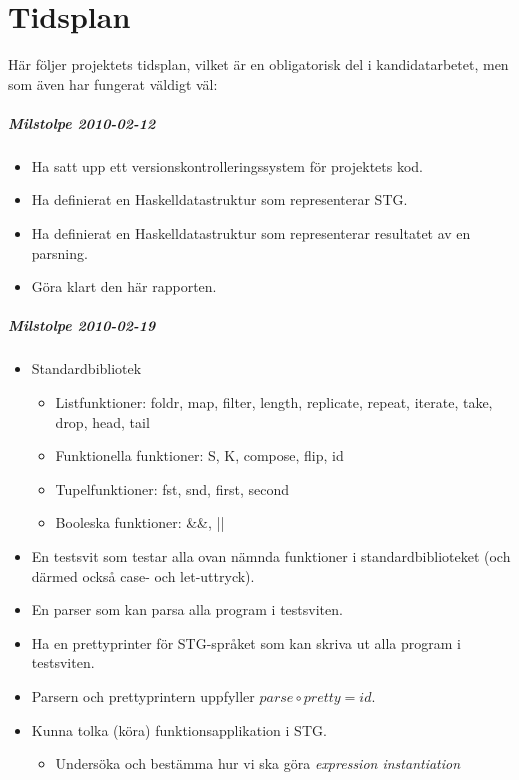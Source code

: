 \documentclass[../Appendix]{subfiles}
\begin{document}
\chapter{Tidsplan}

Här följer projektets tidsplan, vilket är en obligatorisk del i kandidatarbetet,
men som även har fungerat väldigt väl: 

\paragraph{Milstolpe 2010-02-12 }
\begin{itemize}
\item Ha satt upp ett versionskontrolleringssystem för projektets kod.
\item Ha definierat en Haskelldatastruktur som representerar STG.
\item Ha definierat en Haskelldatastruktur som representerar resultatet
av en parsning.
\item Göra klart den här rapporten.
\end{itemize}

\paragraph{Milstolpe 2010-02-19}
\begin{itemize}
\item Standardbibliotek

\begin{itemize}
\item Listfunktioner: foldr, map, filter, length, replicate, repeat, iterate,
take, drop, head, tail
\item Funktionella funktioner: S, K, compose, flip, id
\item Tupelfunktioner: fst, snd, first, second
\item Booleska funktioner: \&\&, ||
\end{itemize}
\item En testsvit som testar alla ovan nämnda funktioner i standardbiblioteket
(och därmed också case- och let-uttryck).
\item En parser som kan parsa alla program i testsviten.
\item Ha en prettyprinter för STG-språket som kan skriva ut alla program
i testsviten.
\item Parsern och prettyprintern uppfyller $parse\circ pretty=id$.
\item Kunna tolka (köra) funktionsapplikation i STG.

\begin{itemize}
\item Undersöka och bestämma hur vi ska göra \textit{expression instantiation}%
\end{itemize}
\end{itemize}
\end{document}
